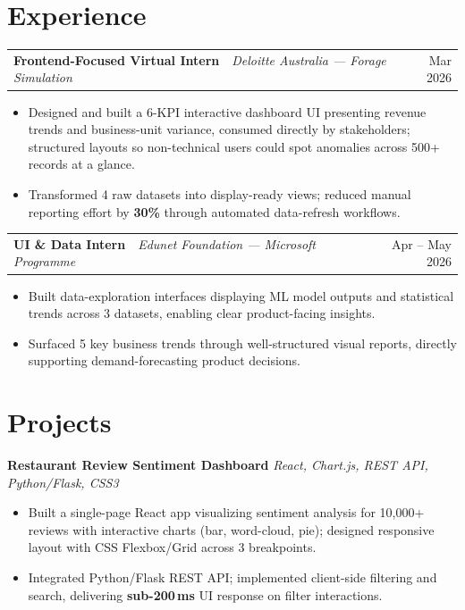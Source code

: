 \documentclass[10pt, letterpaper]{article}
\makeatletter
\newcommand{\role}[3]{%
  \noindent\begin{tabularx}{\linewidth}{@{}X r@{}}
    \textbf{#1} \,\textbar\, {\color{darkgray}\textit{#2}} & {\footnotesize\color{midgray}#3}
  \end{tabularx}\vspace{2pt}}
\newcommand{\proj}[2]{%
  \vspace{2pt}\noindent\textbf{#1} \hfill {\footnotesize\color{midgray}\textit{#2}}\\[-4pt]}
\makeatother
\begin{document}
\section{Experience}

\role{Frontend-Focused Virtual Intern}{Deloitte Australia --- Forage Simulation}{Mar 2026}
\begin{itemize}
  \item Designed and built a 6-KPI interactive dashboard UI presenting revenue trends and business-unit variance, consumed directly by stakeholders; structured layouts so non-technical users could spot anomalies across 500+ records at a glance.
  \item Transformed 4 raw datasets into display-ready views; reduced manual reporting effort by \textbf{30\%} through automated data-refresh workflows.
\end{itemize}

\vspace{2pt}

\role{UI \& Data Intern}{Edunet Foundation --- Microsoft Programme}{Apr -- May 2026}
\begin{itemize}
  \item Built data-exploration interfaces displaying ML model outputs and statistical trends across 3 datasets, enabling clear product-facing insights.
  \item Surfaced 5 key business trends through well-structured visual reports, directly supporting demand-forecasting product decisions.
\end{itemize}

\section{Projects}

\proj{Restaurant Review Sentiment Dashboard}{React, Chart.js, REST API, Python/Flask, CSS3}
\begin{itemize}
  \item Built a single-page React app visualizing sentiment analysis for 10,000+ reviews with interactive charts (bar, word-cloud, pie); designed responsive layout with CSS Flexbox/Grid across 3 breakpoints.
  \item Integrated Python/Flask REST API; implemented client-side filtering and search, delivering \textbf{sub-200\,ms} UI response on filter interactions.
\end{itemize}
\end{document}
